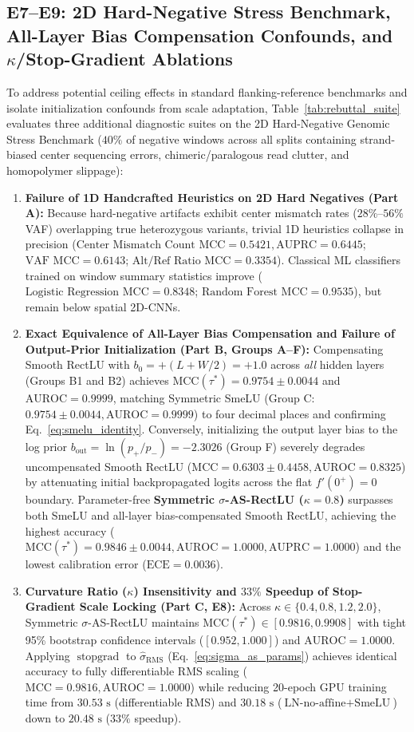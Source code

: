 \documentclass[10pt,a4paper]{article}
\begin{document}
\subsection{E7--E9: 2D Hard-Negative Stress Benchmark, All-Layer Bias Compensation Confounds, and $\kappa$/Stop-Gradient Ablations}
\label{sec:rebuttal_results}
To address potential ceiling effects in standard flanking-reference benchmarks and isolate initialization confounds from scale adaptation, Table~\ref{tab:rebuttal_suite} evaluates three additional diagnostic suites on the 2D Hard-Negative Genomic Stress Benchmark ($40\%$ of negative windows across all splits containing strand-biased center sequencing errors, chimeric/paralogous read clutter, and homopolymer slippage):
\begin{enumerate}
    \item \textbf{Failure of 1D Handcrafted Heuristics on 2D Hard Negatives (Part A):} Because hard-negative artifacts exhibit center mismatch rates ($28\%$--$56\%$ VAF) overlapping true heterozygous variants, trivial 1D heuristics collapse in precision ($\text{Center Mismatch Count MCC} = 0.5421, \text{AUPRC} = 0.6445$; $\text{VAF MCC} = 0.6143$; $\text{Alt/Ref Ratio MCC} = 0.3354$). Classical ML classifiers trained on window summary statistics improve ($\text{Logistic Regression MCC} = 0.8348$; $\text{Random Forest MCC} = 0.9535$), but remain below spatial 2D-CNNs.
    \item \textbf{Exact Equivalence of All-Layer Bias Compensation and Failure of Output-Prior Initialization (Part B, Groups A--F):} Compensating Smooth RectLU with $b_0 = +(L+W/2) = +1.0$ across \textit{all} hidden layers (Groups B1 and B2) achieves $\text{MCC}(\tau^*) = 0.9754 \pm 0.0044$ and $\text{AUROC} = 0.9999$, matching Symmetric SmeLU (Group C: $0.9754 \pm 0.0044, \text{AUROC} = 0.9999$) to four decimal places and confirming Eq.~\eqref{eq:smelu_identity}. Conversely, initializing the output layer bias to the log prior $b_{\text{out}} = \ln(p_+/p_-) = -2.3026$ (Group F) severely degrades uncompensated Smooth RectLU ($\text{MCC} = 0.6303 \pm 0.4458, \text{AUROC} = 0.8325$) by attenuating initial backpropagated logits across the flat $f'(0^+)=0$ boundary. Parameter-free \textbf{Symmetric $\sigma$-AS-RectLU ($\kappa=0.8$)} surpasses both SmeLU and all-layer bias-compensated Smooth RectLU, achieving the highest accuracy ($\text{MCC}(\tau^*) = 0.9846 \pm 0.0044, \text{AUROC} = 1.0000, \text{AUPRC} = 1.0000$) and the lowest calibration error ($\text{ECE} = 0.0036$).
    \item \textbf{Curvature Ratio ($\kappa$) Insensitivity and $33\%$ Speedup of Stop-Gradient Scale Locking (Part C, E8):} Across $\kappa \in \{0.4, 0.8, 1.2, 2.0\}$, Symmetric $\sigma$-AS-RectLU maintains $\text{MCC}(\tau^*) \in [0.9816, 0.9908]$ with tight 95\% bootstrap confidence intervals ($[0.952, 1.000]$) and $\text{AUROC} = 1.0000$. Applying $\operatorname{stopgrad}$ to $\hat{\sigma}_{\text{RMS}}$ (Eq.~\ref{eq:sigma_as_params}) achieves identical accuracy to fully differentiable RMS scaling ($\text{MCC} = 0.9816, \text{AUROC} = 1.0000$) while reducing 20-epoch GPU training time from $30.53\text{ s}$ (differentiable RMS) and $30.18\text{ s}$ ($\text{LN-no-affine} + \text{SmeLU}$) down to $20.48\text{ s}$ ($33\%$ speedup).

\end{enumerate}
\end{document}
